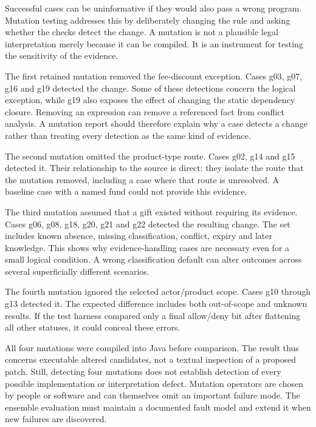 \label{sec:circular-mutations}
Successful cases can be uninformative if they would also pass a wrong program.
Mutation testing addresses this by deliberately changing the rule and asking
whether the checks detect the change. A mutation is not a plausible legal
interpretation merely because it can be compiled. It is an instrument for
testing the sensitivity of the evidence.

The first retained mutation removed the fee-discount exception. Cases g03, g07,
g16 and g19 detected the change. Some of these detections concern the logical
exception, while g19 also exposes the effect of changing the static dependency
closure. Removing an expression can remove a referenced fact from conflict
analysis. A mutation report should therefore explain why a case detects a
change rather than treating every detection as the same kind of evidence.

The second mutation omitted the product-type route. Cases g02, g14 and g15
detected it. Their relationship to the source is direct: they isolate the
route that the mutation removed, including a case where that route is
unresolved. A baseline case with a named fund could not provide this evidence.


The third mutation assumed that a gift existed without requiring its evidence.
Cases g06, g08, g18, g20, g21 and g22 detected the resulting change. The set
includes known absence, missing classification, conflict, expiry and later
knowledge. This shows why evidence-handling cases are necessary even for a
small logical condition. A wrong classification default can alter outcomes
across several superficially different scenarios.

The fourth mutation ignored the selected actor/product scope. Cases g10 through
g13 detected it. The expected difference includes both out-of-scope and unknown
results. If the test harness compared only a final allow/deny bit after
flattening all other statuses, it could conceal these errors.

All four mutations were compiled into Java before comparison. The result thus
concerns executable altered candidates, not a textual inspection of a proposed
patch. Still, detecting four mutations does not establish detection of every
possible implementation or interpretation defect. Mutation operators are chosen
by people or software and can themselves omit an important failure mode. The
ensemble evaluation must maintain a documented fault model and extend it when
new failures are discovered.

